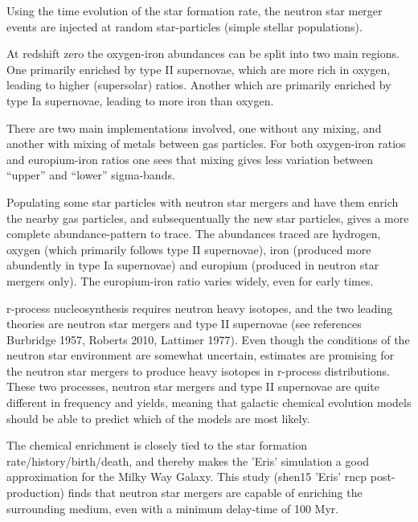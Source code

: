 Using the time evolution of the star formation rate, the neutron star merger events are injected at random star-particles (simple stellar populations).

At redshift zero the oxygen-iron abundances can be split into two main regions. One primarily enriched by type II supernovae, which are more rich in oxygen, leading to higher (supersolar) ratios. Another which are primarily enriched by type Ia supernovae, leading to more iron than oxygen.

There are two main implementations involved, one without any mixing, and another with mixing of metals between gas particles. For both oxygen-iron ratios and europium-iron ratios one sees that mixing gives less variation between ``upper'' and ``lower'' sigma-bands.

Populating some star particles with neutron star mergers and have them enrich the nearby gas particles, and subsequentually the new star particles, gives a more complete abundance-pattern to trace.
The abundances traced are hydrogen, oxygen (which primarily follows type II supernovae), iron (produced more abundently in type Ia supernovae) and europium (produced in neutron star mergers only). The europium-iron ratio varies widely, even for early times.

r-process nucleosynthesis requires neutron heavy isotopes, and the two leading theories are neutron star mergers and type II supernovae (see references Burbridge 1957, Roberts 2010, Lattimer 1977). Even though the conditions of the neutron star environment are somewhat uncertain, estimates are promising for the neutron star mergers to produce heavy isotopes in r-process distributions.
These two processes, neutron star mergers and type II supernovae are quite different in frequency and yields, meaning that galactic chemical evolution models should be able to predict which of the models are most likely.

The chemical enrichment is closely tied to the star formation rate/history/birth/death, and thereby makes the 'Eris' simulation a good approximation for the Milky Way Galaxy.
This study (shen15 'Eris' rncp post-production) finds that neutron star mergers are capable of enriching the surrounding medium, even with a minimum delay-time of 100 Myr.

